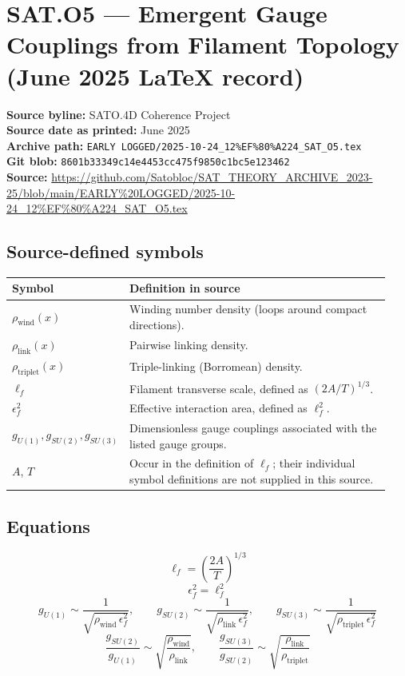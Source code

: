 \documentclass[11pt]{article}
\begin{document}
\section*{SAT.O5 --- Emergent Gauge Couplings from Filament Topology (June 2025 \LaTeX{} record)}

\textbf{Source byline:} SATO.4D Coherence Project\\
\textbf{Source date as printed:} June 2025\\
\textbf{Archive path:} \texttt{EARLY LOGGED/2025-10-24\_12\%EF\%80\%A224\_SAT\_O5.tex}\\
\textbf{Git blob:} \texttt{8601b33349c14e4453cc475f9850c1bc5e123462}\\
\textbf{Source:} \url{https://github.com/Satobloc/SAT_THEORY_ARCHIVE_2023-25/blob/main/EARLY%20LOGGED/2025-10-24_12%EF%80%A224_SAT_O5.tex}

\subsection*{Source-defined symbols}
\small
\begin{longtable}{L{0.24\linewidth}L{0.70\linewidth}}
\toprule
\textbf{Symbol} & \textbf{Definition in source}\\
\midrule
\endhead
$\rho_{\mathrm{wind}}(x)$ & Winding number density (loops around compact directions).\\
$\rho_{\mathrm{link}}(x)$ & Pairwise linking density.\\
$\rho_{\mathrm{triplet}}(x)$ & Triple-linking (Borromean) density.\\
$\ell_f$ & Filament transverse scale, defined as $(2A/T)^{1/3}$.\\
$\epsilon^2_f$ & Effective interaction area, defined as $\ell_f^2$.\\
$g_{U(1)},g_{SU(2)},g_{SU(3)}$ & Dimensionless gauge couplings associated with the listed gauge groups.\\
$A$, $T$ & Occur in the definition of $\ell_f$; their individual symbol definitions are not supplied in this source.\\
\bottomrule
\end{longtable}
\normalsize

\subsection*{Equations}
\begin{equation*}
 \ell_f=\left(\frac{2A}{T}\right)^{1/3}
\end{equation*}
\begin{equation*}
 \epsilon^2_f=\ell_f^2
\end{equation*}
\begin{equation*}
 g_{U(1)}\sim\frac{1}{\sqrt{\rho_{\mathrm{wind}}\,\epsilon^2_f}},\qquad
 g_{SU(2)}\sim\frac{1}{\sqrt{\rho_{\mathrm{link}}\,\epsilon^2_f}},\qquad
 g_{SU(3)}\sim\frac{1}{\sqrt{\rho_{\mathrm{triplet}}\,\epsilon^2_f}}
\end{equation*}
\begin{equation*}
 \frac{g_{SU(2)}}{g_{U(1)}}\sim\sqrt{\frac{\rho_{\mathrm{wind}}}{\rho_{\mathrm{link}}}},\qquad
 \frac{g_{SU(3)}}{g_{SU(2)}}\sim\sqrt{\frac{\rho_{\mathrm{link}}}{\rho_{\mathrm{triplet}}}}
\end{equation*}
\end{document}
